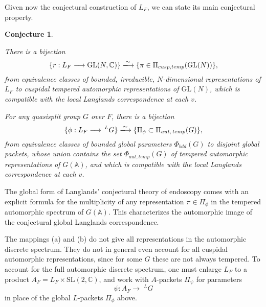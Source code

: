 \documentclass[preprint,12pt, leqno]{elsarticle}
\newcommand{\mA}{\mathbb{A}}
\newcommand{\mC}{\mathbb{C}}
\newcommand{\SL}{\mbox{SL}}
\newcommand{\GL}{\mbox{GL}}
\newcommand{\LG}{\;^LG}
\numberwithin{equation}{section}
\newtheorem{conjecturegroup}{Conjecture}
\theoremstyle{named}
\begin{document}
Given now the conjectural construction of $L_F$, we can state its main conjectural property.
\begin{conjecturegroup}\label{conj: 1}

    \begin{description}[leftmargin=0pt]
        \item[(a).] There is a bijection
         \begin{equation*}
        \{r: L_F\longrightarrow \mbox{GL}(N, \mathbb{C})\} \xlongrightarrow{\sim} \{\pi\in \Pi_{cusp, temp}(\mbox{GL}(N))\},
    \end{equation*}
    from equivalence classes of bounded, irreducible, $N$-dimensional representations of $L_F$ to cuspidal tempered automorphic representations of $\GL(N)$, which is compatible with the local Langlands correspondence at each $v$.
        \item[    (b).] For any quasisplit group $G$ over $F$, there is a bijection
        \begin{equation*}
        \{\phi: L_F\longrightarrow\,^LG\} \xlongrightarrow{\sim} \{\Pi_{\phi}\subset \Pi_{aut,\, temp}(G)\},
        \end{equation*}
    from equivalence classes of bounded global parameters $\Phi_{bdd}(G)$ to disjoint global packets, whose union contains the set $\Phi_{aut, temp}(G)$ of tempered automorphic representations of $G(\mA)$, and which is compatible with the local Langlands correspondence at each $v$.
    \end{description}
\end{conjecturegroup}
\begin{description}[leftmargin=0pt]
        \item[Remarks 1.] The global form of Langlands' conjectural theory of endoscopy comes with an explicit formula for the multiplicity of any representation $\pi\in\Pi_{\phi}$ in the tempered automorphic spectrum of $G(\mA)$. This characterizes the automorphic image of the conjectural global Langlands correspondence.
        \item[2.] The mappings (a) and (b) do not give all representations in the automorphic discrete spectrum. They do not in general even account for all cuspidal automorphic representations, since for some $G$ these are not always tempered. To account for the full automorphic discrete spectrum, one must enlarge $L_F$ to a product $A_F = L_F\times \SL(2, \mC)$, and work with $A$-packets $\Pi_{\psi}$ for parameters
        \begin{equation*}
            \psi: A_F\longrightarrow\LG
        \end{equation*}
        in place of the global $L$-packets $\Pi_{\phi}$ above.
\end{description}
\end{document}
